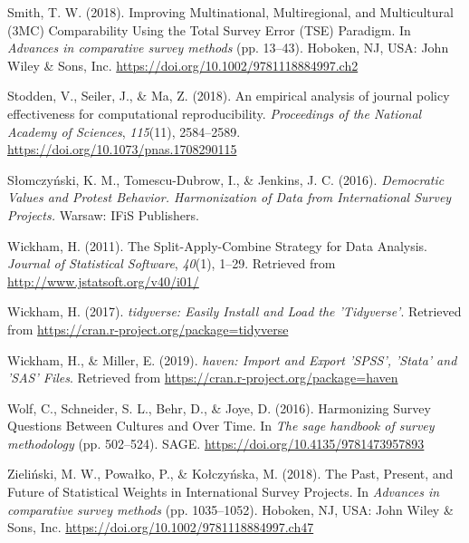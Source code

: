 \documentclass[12pt,]{article}
\begin{document}
\leavevmode\hypertarget{ref-Smith2018}{}%
Smith, T. W. (2018). Improving Multinational, Multiregional, and Multicultural (3MC) Comparability Using the Total Survey Error (TSE) Paradigm. In \emph{Advances in comparative survey methods} (pp. 13--43). Hoboken, NJ, USA: John Wiley \& Sons, Inc. \url{https://doi.org/10.1002/9781118884997.ch2}

\leavevmode\hypertarget{ref-Stodden2018}{}%
Stodden, V., Seiler, J., \& Ma, Z. (2018). An empirical analysis of journal policy effectiveness for computational reproducibility. \emph{Proceedings of the National Academy of Sciences}, \emph{115}(11), 2584--2589. \url{https://doi.org/10.1073/pnas.1708290115}

\leavevmode\hypertarget{ref-Slomczynskietal2016}{}%
Słomczyński, K. M., Tomescu-Dubrow, I., \& Jenkins, J. C. (2016). \emph{Democratic Values and Protest Behavior. Harmonization of Data from International Survey Projects.} Warsaw: IFiS Publishers.

\leavevmode\hypertarget{ref-Wickham2011}{}%
Wickham, H. (2011). The Split-Apply-Combine Strategy for Data Analysis. \emph{Journal of Statistical Software}, \emph{40}(1), 1--29. Retrieved from \url{http://www.jstatsoft.org/v40/i01/}

\leavevmode\hypertarget{ref-tidyverse}{}%
Wickham, H. (2017). \emph{tidyverse: Easily Install and Load the 'Tidyverse'}. Retrieved from \url{https://cran.r-project.org/package=tidyverse}

\leavevmode\hypertarget{ref-haven}{}%
Wickham, H., \& Miller, E. (2019). \emph{haven: Import and Export 'SPSS', 'Stata' and 'SAS' Files}. Retrieved from \url{https://cran.r-project.org/package=haven}

\leavevmode\hypertarget{ref-Wolf2016}{}%
Wolf, C., Schneider, S. L., Behr, D., \& Joye, D. (2016). Harmonizing Survey Questions Between Cultures and Over Time. In \emph{The sage handbook of survey methodology} (pp. 502--524). SAGE. \url{https://doi.org/10.4135/9781473957893}

\leavevmode\hypertarget{ref-Zielinski2018}{}%
Zieliński, M. W., Powałko, P., \& Kołczyńska, M. (2018). The Past, Present, and Future of Statistical Weights in International Survey Projects. In \emph{Advances in comparative survey methods} (pp. 1035--1052). Hoboken, NJ, USA: John Wiley \& Sons, Inc. \url{https://doi.org/10.1002/9781118884997.ch47}
\end{document}
